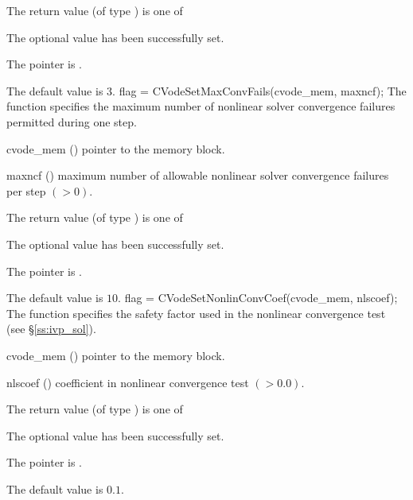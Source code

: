 {
  The return value  (of type ) is one of
  \begin{args}
  \item[\Id{CV\_SUCCESS}] 
    The optional value has been successfully set.
  \item[\Id{CV\_MEM\_NULL}]
    The  pointer is .
  \end{args}
}
{
  The default value is $3$.
}
{
flag = CVodeSetMaxConvFails(cvode\_mem, maxncf);
}
{
  The function  specifies the
  maximum number of nonlinear solver convergence failures permitted during
  one step.
}
{
  \begin{args}
  \item[cvode\_mem] ()
    pointer to the {\cvode} memory block.
  \item[maxncf] ()
    maximum number of allowable nonlinear solver convergence failures
    per step $( > 0)$.
  \end{args}
}
{
  The return value  (of type ) is one of
  \begin{args}
  \item[\Id{CV\_SUCCESS}] 
    The optional value has been successfully set.
  \item[\Id{CV\_MEM\_NULL}]
    The  pointer is .
  \end{args}
}
{
  The default value is $10$.
}
{
flag = CVodeSetNonlinConvCoef(cvode\_mem, nlscoef);
}
{
  The function  specifies the safety factor used
  in the nonlinear convergence test (see \S\ref{ss:ivp_sol}).
}
{
  \begin{args}
  \item[cvode\_mem] ()
    pointer to the {\cvode} memory block.
  \item[nlscoef] ()
    coefficient in nonlinear convergence test $( > 0.0)$.
  \end{args}
}
{
  The return value  (of type ) is one of
  \begin{args}
  \item[\Id{CV\_SUCCESS}] 
    The optional value has been successfully set.
  \item[\Id{CV\_MEM\_NULL}]
    The  pointer is .
  \end{args}
}
{
  The default value is $0.1$.
}
